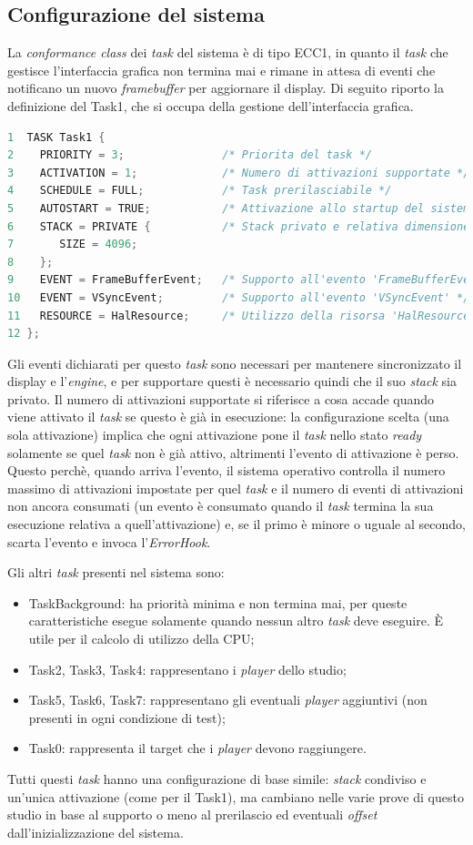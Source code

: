 \documentclass{article}
\begin{document}
\subsection{Configurazione del sistema}
La \textit{conformance class} dei \textit{task} del sistema è di tipo ECC1, in quanto il \textit{task} che gestisce l'interfaccia grafica non termina mai e rimane in attesa di eventi che notificano un nuovo \textit{framebuffer} per aggiornare il display.
Di seguito riporto la definizione del Task1, che si occupa della gestione dell'interfaccia grafica.
\begin{lstlisting}[language=C]
1  TASK Task1 {
2	 PRIORITY = 3;               /* Priorita del task */
3	 ACTIVATION = 1;             /* Numero di attivazioni supportate */
4	 SCHEDULE = FULL;            /* Task prerilasciabile */
5	 AUTOSTART = TRUE;           /* Attivazione allo startup del sistema */
6	 STACK = PRIVATE {           /* Stack privato e relativa dimensione */
7	 	SIZE = 4096;
8	 };
9	 EVENT = FrameBufferEvent;   /* Supporto all'evento 'FrameBufferEvent' */
10	 EVENT = VSyncEvent;         /* Supporto all'evento 'VSyncEvent' */
11	 RESOURCE = HalResource;     /* Utilizzo della risorsa 'HalResource' */
12 };
\end{lstlisting}
Gli eventi dichiarati per questo \textit{task} sono necessari per mantenere sincronizzato il display e l'\textit{engine}, e per supportare questi è necessario quindi che il suo \textit{stack} sia privato. Il numero di attivazioni supportate si riferisce a cosa accade quando viene attivato il \textit{task} se questo è già in esecuzione: la configurazione scelta (una sola attivazione) implica che ogni attivazione pone il \textit{task} nello stato \textit{ready} solamente se quel \textit{task} non è già attivo, altrimenti l'evento di attivazione è perso. Questo perchè, quando arriva l'evento, il sistema operativo controlla il numero massimo di attivazioni impostate per quel \textit{task} e il numero di eventi di attivazioni non ancora consumati (un evento è consumato quando il \textit{task} termina la sua esecuzione relativa a quell'attivazione) e, se il primo è minore o uguale al secondo, scarta l'evento e invoca l'\textit{ErrorHook}.

Gli altri \textit{task} presenti nel sistema sono:
\begin{itemize}
	\item TaskBackground: ha priorità minima e non termina mai, per queste caratteristiche esegue solamente quando nessun altro \textit{task} deve eseguire. È utile per il calcolo di utilizzo della CPU;
	\item Task2, Task3, Task4: rappresentano i \textit{player} dello studio;
	\item Task5, Task6, Task7: rappresentano gli eventuali \textit{player} aggiuntivi (non presenti in ogni condizione di test);
	\item Task0: rappresenta il target che i \textit{player} devono raggiungere.
\end{itemize}
Tutti questi \textit{task} hanno una configurazione di base simile: \textit{stack} condiviso e un'unica attivazione (come per il Task1), ma cambiano nelle varie prove di questo studio in base al supporto o meno al prerilascio ed eventuali \textit{offset} dall'inizializzazione del sistema.
\end{document}
